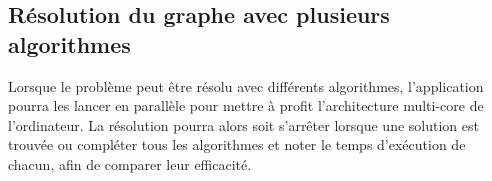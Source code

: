 \documentclass[french]{article}
\begin{document}
		\subsection{Résolution du graphe avec plusieurs algorithmes}
			Lorsque le problème peut être résolu avec différents algorithmes, l'application pourra les lancer en parallèle pour mettre à profit l'architecture multi-core de l'ordinateur. La résolution pourra alors soit s'arrêter lorsque une solution est trouvée ou compléter tous les algorithmes et noter le temps d'exécution de chacun, afin de comparer leur efficacité.
			
		
	
\end{document}
